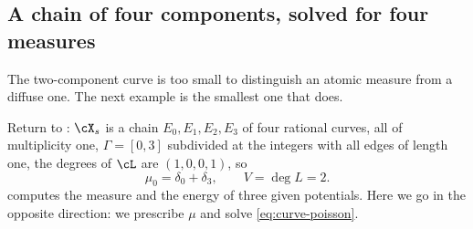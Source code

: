 \subsection{A chain of four components, solved for four measures}
\label{sec:ch31-chain}

The two-component curve is too small to distinguish an atomic measure from a
diffuse one.  The next example is the smallest one that does.

\begin{example}
\label{ex:ch31-chain-solve}
Return to : \(\cX_s\) is a chain
\(E_0,E_1,E_2,E_3\) of four rational curves, all of multiplicity one,
\(\Gamma=[0,3]\) subdivided at the integers with all edges of length one,
the degrees of \(\cL\) are \((1,0,0,1)\), so
\[
 \mu_0=\delta_0+\delta_3,\qquad V=\deg L=2 .
\]
 computes the measure and the energy of three
given potentials.  Here we go in the opposite direction: we prescribe
\(\mu\) and solve \eqref{eq:curve-poisson}.


\end{example}

